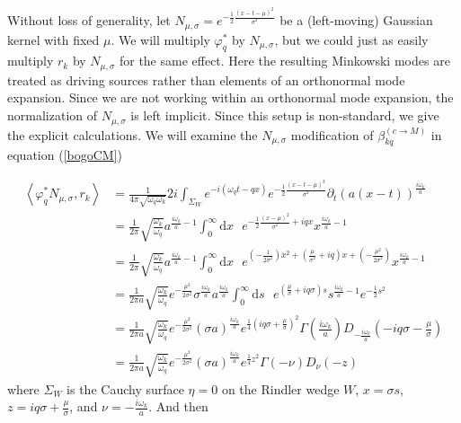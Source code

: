 \documentclass[12pt,a4paper]{article}
\newcommand{\dv}[1]{\mathrm{d} #1 \text{ }}
\begin{document}
{Without loss of generality, let $N_{\mu, \sigma} = e^{-\frac{1}{2} \frac{(x-t-\mu)^2}{\sigma^2}}$ be a (left-moving) Gaussian kernel with fixed $\mu$. We will multiply $\varphi_q^*$ by $N_{\mu, \sigma}$, but we could just as easily multiply $r_k$ by $N_{\mu, \sigma}$ for the same effect. Here the resulting Minkowski modes are treated as driving sources rather than elements of an orthonormal mode expansion. Since we are not working within an orthonormal mode expansion, the normalization of $N_{\mu, \sigma}$ is left implicit. Since this setup is non-standard, we give the explicit calculations.  We will examine the $N_{\mu,\sigma}$ modification of $\beta^{(c \rightarrow M)}_{kq}$ in  equation (\ref{bogoCM})

\begin{equation}
  \begin{aligned}
    \left< \varphi_q^* N_{\mu,\sigma}, r_k\right> &= \frac{1}{4\pi \sqrt{\omega_q \omega_k}} 2i \int_{\Sigma_W} e^{-i(\omega_q t - q x)} e^{-\frac{1}{2} \frac{(x-t-\mu)^2}{\sigma^2}} \partial_t (a(x-t))^\frac{i\omega_k}{a} \\
    &= \frac{1}{2\pi} \sqrt{\frac{\omega_k}{\omega_q}} a^{\frac{i \omega_k}{a} - 1} \int_0^\infty  \dv{x} e^{-\frac{1}{2} \frac{(x-\mu)^2}{\sigma^2} + i q x} x^{\frac{i\omega_k}{a} - 1} \\
    &= \frac{1}{2\pi} \sqrt{\frac{\omega_k}{\omega_q}} a^{\frac{i \omega_k}{a} - 1} \int_0^\infty \dv{x} e^{\left(-\frac{1}{2\sigma^2}\right) x^2 + \left(\frac{\mu}{\sigma^2} + i q \right) x + \left( -\frac{\mu^2}{2\sigma^2}\right)} x^{\frac{i\omega_k}{a} - 1}  \\
    &= \frac{1}{2\pi a} \sqrt{\frac{\omega_k}{\omega_q}} e^{-\frac{\mu^2}{2 \sigma^2}} \sigma^{\frac{i\omega_k}{a}} a^{\frac{i \omega_k}{a} }  \int_0^\infty \dv{s} e^{(\frac{\mu}{\sigma} + i q \sigma)s} s^{\frac{i\omega_k}{a} - 1} e^{-\frac{1}{2} s^2} \\
    &= \frac{1}{2\pi a} \sqrt{\frac{\omega_k}{\omega_q}} e^{-\frac{\mu^2}{2 \sigma^2}} {(\sigma a)}^{\frac{i \omega_k}{a}} e^{\frac{1}{4}(i q \sigma + \frac{\mu}{\sigma})^2} \Gamma\left(\frac{i\omega_k}{a}\right) D_{-\frac{i\omega_k}{a}}(-i q\sigma - \frac{\mu}{\sigma}) \\
    &=  \frac{1}{2\pi a } \sqrt{\frac{\omega_k}{\omega_q}} e^{-\frac{\mu^2}{2 \sigma^2}}  (\sigma a)^\frac{i\omega_k}{a} e^{\frac{1}{4} z^2} \Gamma(-\nu) D_\nu(-z)
  \end{aligned}
\end{equation}
where $\Sigma_W$ is the Cauchy surface $\eta=0$ on the Rindler wedge $W$,  $x = \sigma s$, $z = i q \sigma + \frac{\mu}{\sigma}$, and $\nu = -\frac{i \omega_k}{a}$. And then
}
\end{document}

